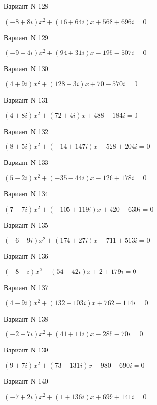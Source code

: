 \documentclass[11pt]{report}
\begin{document}
Вариант N 128

$(-8 + 8 i)x^2 + (16 + 64 i)x + 568 + 696 i = 0$

Вариант N 129

$(-9 - 4 i)x^2 + (94 + 31 i)x  -195 - 507 i = 0$

Вариант N 130

$(4 + 9 i)x^2 + (128 - 3 i)x + 70 - 570 i = 0$

Вариант N 131

$(4 + 8 i)x^2 + (72 + 4 i)x + 488 - 184 i = 0$

Вариант N 132

$(8 + 5 i)x^2 + (-14 + 147 i)x  -528 + 204 i = 0$

Вариант N 133

$(5 - 2 i)x^2 + (-35 - 44 i)x  -126 + 178 i = 0$

Вариант N 134

$(7 - 7 i)x^2 + (-105 + 119 i)x + 420 - 630 i = 0$

Вариант N 135

$(-6 - 9 i)x^2 + (174 + 27 i)x  -711 + 513 i = 0$

Вариант N 136

$(-8 - i)x^2 + (54 - 42 i)x + 2 + 179 i = 0$

Вариант N 137

$(4 - 9 i)x^2 + (132 - 103 i)x + 762 - 114 i = 0$

Вариант N 138

$(-2 - 7 i)x^2 + (41 + 11 i)x  -285 - 70 i = 0$

Вариант N 139

$(9 + 7 i)x^2 + (73 - 131 i)x  -980 - 690 i = 0$

Вариант N 140

$(-7 + 2 i)x^2 + (1 + 136 i)x + 699 + 141 i = 0$
\end{document}
